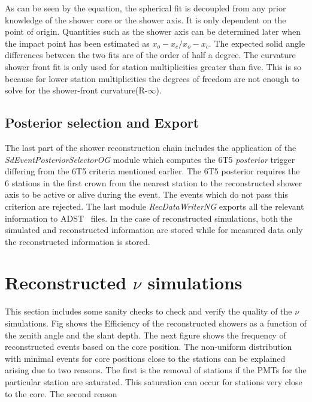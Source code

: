 As can be seen by the equation, the spherical fit is decoupled from any prior knowledge of the shower core or the shower axis. It is only dependent on the point of origin. Quantities such as the shower axis can be determined later when the impact point has been estimated as $x_o -x_c/ x_o-x_c$. The expected solid angle differences between the two fits are of the order of half a degree. The curvature shower front fit is only used for station multiplicities greater than five. This is so because for lower station multiplicities the degrees of freedom are not enough to solve for the shower-front curvature(R-$\infty$). 


\subsection{Posterior selection and Export}
\label{subsec:reco_possel}

The last part of the shower reconstruction chain includes the application of the \textit{SdEventPosteriorSelectorOG} module which computes the 6T5 \textit{posterior} trigger differing from the 6T5 criteria mentioned earlier. The 6T5 posterior requires the 6 stations in the first crown from the nearest station to the reconstructed shower axis to be active or alive during the event. The events which do not pass this criterion are rejected. The last module \textit{RecDataWriterNG} exports all the relevant information to ADST~\cite{} files. In the case of reconstructed simulations, both the simulated and reconstructed information are stored while for measured data only the reconstructed information is stored.


\section{Reconstructed $\nu$ simulations}
\label{sec:reco_possel}
This section includes some sanity checks to check and verify the quality of the $\nu$ simulations. Fig shows the  Efficiency of the reconstructed showers as a function of the zenith angle and the slant depth. The next figure shows the frequency of reconstructed events based on the core position. The non-uniform distribution with minimal events for core positions close to the stations can be explained arising due to two reasons. The first is the removal of stations if the PMTs for the particular station are saturated. This saturation can occur for stations very close to the core. The second reason  



